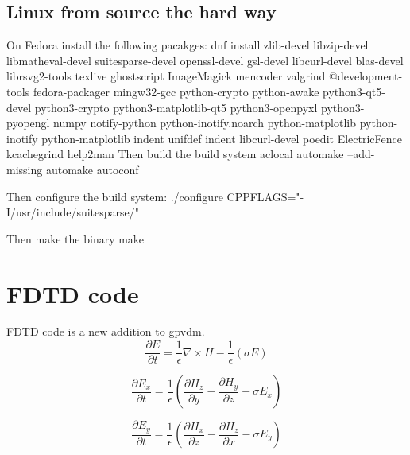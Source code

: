 \documentclass[11pt]{article}
\begin{document}
\subsection{Linux from source the hard way}

On Fedora install the following pacakges:\newline
dnf install zlib-devel libzip-devel libmatheval-devel suitesparse-devel openssl-devel gsl-devel libcurl-devel blas-devel librsvg2-tools texlive ghostscript ImageMagick mencoder valgrind @development-tools fedora-packager mingw32-gcc python-crypto python-awake python3-qt5-devel python3-crypto python3-matplotlib-qt5 python3-openpyxl python3-pyopengl numpy notify-python python-inotify.noarch python-matplotlib python-inotify python-matplotlib indent unifdef indent libcurl-devel poedit ElectricFence kcachegrind help2man\newline
\newline
Then build the build system\newline
aclocal\newline
automake --add-missing\newline
automake\newline
autoconf\newline

Then configure the build system:\newline
./configure CPPFLAGS="-I/usr/include/suitesparse/"\newline

Then make the binary\newline
make\newline

\newpage

\section{FDTD code}
FDTD code is a new addition to gpvdm.
\begin{equation}
\frac{\partial E}{\partial t}= \frac{1}{\epsilon} \nabla \times H - \frac{1}{\epsilon} (\sigma E) 
\end{equation}


\begin{equation}
\frac{\partial E_x}{\partial t}= \frac{1}{\epsilon}(\frac{\partial H_z}{\partial y}-\frac{\partial H_y}{\partial z}-\sigma E_x) 
\end{equation}

\begin{equation}
\frac{\partial E_y}{\partial t}= \frac{1}{\epsilon}(\frac{\partial H_x}{\partial z}-\frac{\partial H_z}{\partial x}-\sigma E_y) 
\end{equation}
\end{document}
